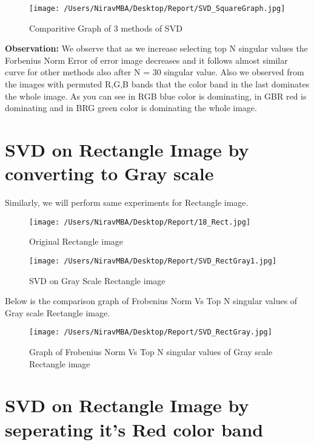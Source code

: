 \documentclass[12pt]{report}
\begin{document}
\begin{figure}[H]
	
	\texttt{[image: /Users/NiravMBA/Desktop/Report/SVD\_SquareGraph.jpg]}
	\caption{Comparitive Graph of 3 methods of SVD}
\end{figure}

{\bfseries Observation: }
We observe that as we increase selecting top N singular values the Forbenius Norm Error of error image decreases and it follows almost similar curve for other
methods also after N = 30 singular value.  Also we observed from the images with permuted R,G,B bands that the color band 
in the last dominates the whole image. As you can see in RGB blue color is dominating, in 
GBR red is dominating and in BRG green color is dominating the whole image.\\

\cleardoublepage

\section{SVD on Rectangle Image by converting to Gray scale}
Similarly, we will perform same experiments for Rectangle image.

\begin{figure}[H]
	\centering
	\texttt{[image: /Users/NiravMBA/Desktop/Report/18\_Rect.jpg]}
	\caption{Original Rectangle image}
\end{figure}


\begin{figure}[H]
	
	\texttt{[image: /Users/NiravMBA/Desktop/Report/SVD\_RectGray1.jpg]}
	\caption{SVD on Gray Scale Rectangle image}
\end{figure}

Below is the comparison graph of Frobenius Norm Vs Top N singular values of Gray scale Rectangle image. \\

\begin{figure}[H]
	
	\texttt{[image: /Users/NiravMBA/Desktop/Report/SVD\_RectGray.jpg]}
	\caption{Graph of Frobenius Norm Vs Top N singular values of Gray scale Rectangle image}
\end{figure}
\cleardoublepage

\section{SVD on Rectangle Image by seperating it's Red color band}
\end{document}
